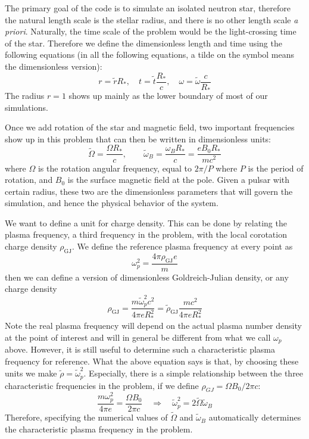 The primary goal of the code is to simulate an isolated neutron star, therefore
the natural length scale is the stellar radius, and there is no other length
scale {\it a priori}. Naturally, the time scale of the problem would be the
light-crossing time of the star. Therefore we define the dimensionless length
and time using the following equations (in all the following equations, a tilde
on the symbol means the dimensionless version):
\begin{equation}
  r = \tilde{r}R_{*},\quad t = \tilde{t}\frac{R_{*}}{c},\quad \omega = \tilde{\omega}\frac{c}{R_{*}}
\end{equation}
The radius $r = 1$ shows up mainly as the lower boundary of most of our
simulations.

Once we add rotation of the star and magnetic field, two important frequencies
show up in this problem that can then be written in dimensionless units:
\begin{equation}
  \tilde{\Omega} = \frac{\Omega R_{*}}{c},\qquad \tilde{\omega}_B = \frac{\omega_BR_{*}}{c} = \frac{e B_0R_{*}}{mc^2}
\end{equation}
where $\Omega$ is the rotation angular frequency, equal to $2\pi / P$ where $P$ is the period of rotation, and $B_0$ is the surface magnetic field at the pole. Given a pulsar with certain radius, these two are the dimensionless parameters that will govern the simulation, and hence the physical behavior of the system.

We want to define a unit for charge density. This can be done by relating the
plasma frequency, a third frequency in the problem, with the local corotation
charge density $\rho_\mathrm{GJ}$. We define the reference plasma frequency at every
point as
\begin{equation}
  \omega_p^2 = \frac{4\pi \rho_\mathrm{GJ}e}{m}
\end{equation}
then we can define a version of dimensionless Goldreich-Julian density, or any charge density
\begin{equation}
  \rho_\mathrm{GJ} = \frac{m \tilde{\omega}_p^2 c^2}{4\pi e R_{*}^2} = \tilde{\rho}_\mathrm{GJ} \frac{mc^2}{4\pi eR_{*}^2}
\end{equation}
Note the real plasma frequency will depend on the actual plasma number density
at the point of interest and will in general be different from what we call
$\omega_p$ above. However, it is still useful to determine such a characteristic
plasma frequency for reference. What the above equation says is that, by
choosing these units we make $\tilde{\rho} = \tilde{\omega}_p^2$. Especially,
there is a simple relationship between the three characteristic frequencies in
the problem, if we define $\rho_{GJ} = \Omega B_0 / 2\pi c$:
\begin{equation}
  \frac{m \omega_p^2}{4\pi e} = \frac{\Omega B_0}{2\pi c} \quad \Longrightarrow \quad \tilde{\omega}_p^2 = 2\tilde{\Omega} \tilde{\omega}_B
\end{equation}
Therefore, specifying the numerical values of $\tilde{\Omega}$ and
$\tilde{\omega}_B$ automatically determines the characteristic plasma frequency
in the problem.

